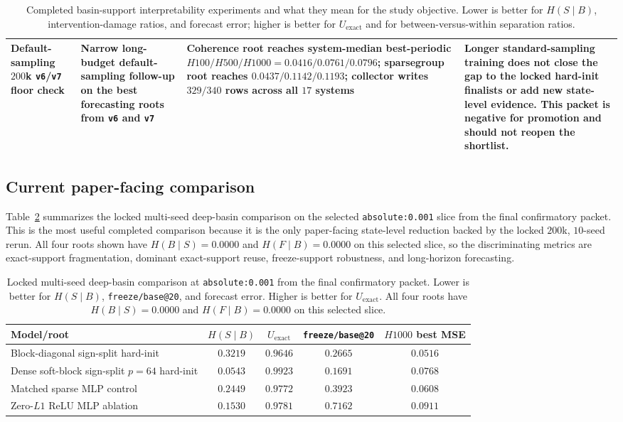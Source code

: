 \documentclass[11pt]{article}
\begin{document}
\begin{table}[t]
\begin{tabular}{p{2.6cm} p{2.8cm} p{4.0cm} p{5.0cm}}
\addlinespace
Default-sampling $200$k \texttt{v6}/\texttt{v7} floor check & Narrow long-budget default-sampling follow-up on the best forecasting roots from \texttt{v6} and \texttt{v7} & Coherence root reaches system-median best-periodic $H100/H500/H1000 = 0.0416 / 0.0761 / 0.0796$; sparsegroup root reaches $0.0437 / 0.1142 / 0.1193$; collector writes $329/340$ rows across all $17$ systems & Longer standard-sampling training does not close the gap to the locked hard-init finalists or add new state-level evidence. This packet is negative for promotion and should not reopen the shortlist. \\
\bottomrule
\end{tabular}
\caption{Completed basin-support interpretability experiments and what they mean for the study objective. Lower is better for $H(S \mid B)$, intervention-damage ratios, and forecast error; higher is better for $U_{\text{exact}}$ and for between-versus-within separation ratios.}
\label{tab:interpretability-chronology}
\end{table}

\subsection{Current paper-facing comparison}

Table~\ref{tab:paper-facing-comparison} summarizes the locked multi-seed
deep-basin comparison on the selected \texttt{absolute:0.001} slice from the
final confirmatory packet. This is the most useful completed comparison
because it is the only paper-facing state-level reduction backed by the locked
$200$k, $10$-seed rerun. All four roots shown have $H(B \mid S)=0.0000$ and
$H(F \mid B)=0.0000$ on this selected slice, so the discriminating metrics are
exact-support fragmentation, dominant exact-support reuse, freeze-support
robustness, and long-horizon forecasting.

\begin{table}[t]
\centering
\small
\begin{tabular}{p{4.7cm}cccc}
\toprule
Model/root & $H(S \mid B)$ & $U_{\text{exact}}$ & \texttt{freeze/base@20} & $H1000$ best MSE \\
\midrule
Block-diagonal sign-split hard-init & $0.3219$ & $0.9646$ & $0.2665$ & $0.0516$ \\
Dense soft-block sign-split $p=64$ hard-init & $0.0543$ & $0.9923$ & $0.1691$ & $0.0768$ \\
Matched sparse MLP control & $0.2449$ & $0.9772$ & $0.3923$ & $0.0608$ \\
Zero-$L1$ ReLU MLP ablation & $0.1530$ & $0.9781$ & $0.7162$ & $0.0911$ \\
\bottomrule
\end{tabular}
\caption{Locked multi-seed deep-basin comparison at \texttt{absolute:0.001} from the final confirmatory packet. Lower is better for $H(S \mid B)$, \texttt{freeze/base@20}, and forecast error. Higher is better for $U_{\text{exact}}$. All four roots have $H(B \mid S)=0.0000$ and $H(F \mid B)=0.0000$ on this selected slice.}
\label{tab:paper-facing-comparison}
\end{table}
\end{document}
